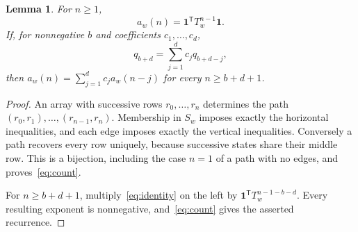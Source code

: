 \documentclass[11pt]{article}
\newtheorem{lemma}[theorem]{Lemma}
\newcommand{\one}{\mathbf{1}}
\begin{document}
\begin{lemma}\label{lem:paths}
For $n\ge1$,
\begin{equation}\label{eq:count}
 a_w(n)=\one^{\mathsf T}T_w^{n-1}\one.
\end{equation}
If, for nonnegative $b$ and coefficients $c_1,\ldots,c_d$,
\begin{equation}\label{eq:identity}
 q_{b+d}=\sum_{j=1}^d c_jq_{b+d-j},
\end{equation}
then $a_w(n)=\sum_{j=1}^dc_ja_w(n-j)$ for every $n\ge b+d+1$.
\end{lemma}
\begin{proof}
An array with successive rows $r_0,\ldots,r_n$ determines the path
$(r_0,r_1),\ldots,(r_{n-1},r_n)$. Membership in $S_w$ imposes exactly the
horizontal inequalities, and each edge imposes exactly the vertical
inequalities. Conversely a path recovers every row uniquely, because
successive states share their middle row. This is a bijection, including
the case $n=1$ of a path with no edges, and proves~\eqref{eq:count}.

For $n\ge b+d+1$, multiply~\eqref{eq:identity} on the left by
$\one^{\mathsf T}T_w^{n-1-b-d}$. Every resulting exponent is nonnegative,
and~\eqref{eq:count} gives the asserted recurrence.
\end{proof}
\end{document}
